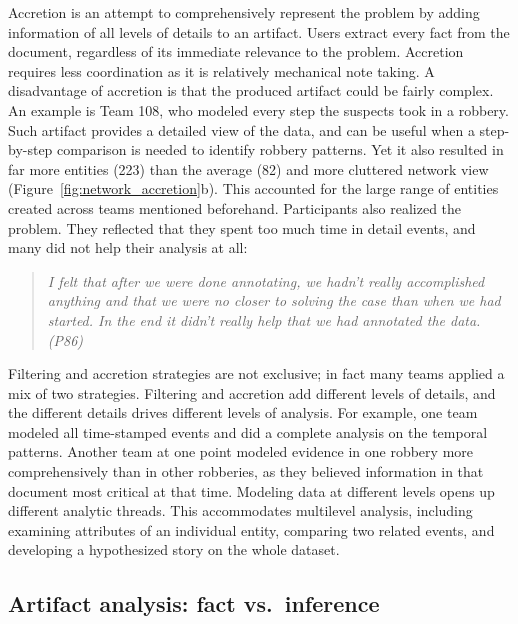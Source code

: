 Accretion is an attempt to comprehensively represent the problem by adding
information of all levels of details to an artifact. Users extract every fact
from the document, regardless of its immediate relevance to the problem.
Accretion requires less coordination as it is relatively mechanical note taking.
A disadvantage of accretion is that the produced artifact could be fairly
complex. An example is Team 108, who modeled every step the suspects took in a
robbery. Such artifact provides a detailed view of the data, and can be useful
when a step-by-step comparison is needed to identify robbery patterns. Yet it
also resulted in far more entities (223) than the average (82) and more
cluttered network view (Figure~\ref{fig:network_accretion}b). This accounted for
the large range of entities created across teams mentioned beforehand.
Participants also realized the problem. They reflected that they spent too much
time in detail events, and many did not help their analysis at all:

\begin{quote}
\emph{I felt that after we were done annotating, we hadn't really accomplished
anything and that we were no closer to solving the case than when we had
started. In the end it didn't really help that we had annotated the
data. (P86)}
\end{quote}

Filtering and accretion strategies are not exclusive; in fact many teams applied
a mix of two strategies. Filtering and accretion add different levels of
details, and the different details drives different levels of analysis. For
example, one team modeled all time-stamped events and did a complete analysis on
the temporal patterns. Another team at one point modeled evidence in one robbery
more comprehensively than in other robberies, as they believed information in
that document most critical at that time. Modeling data at different levels
opens up different analytic threads. This accommodates multilevel analysis,
including examining attributes of an individual entity, comparing two related
events, and developing a hypothesized story on the whole dataset.

\subsection{Artifact analysis: fact
vs.~inference}\label{artifact-construction-fact-vs.inference}

